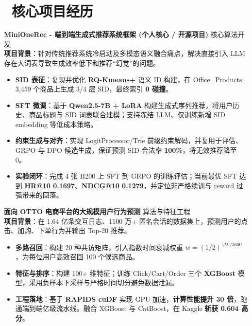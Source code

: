\documentclass[11pt]{article}
\newlength{\interProjectSpacing}
\newcommand{\projectsep}{\vspace{\interProjectSpacing}}
\newlength{\intraProjectTitleSep}
\newcommand{\titlebreak}{\\[\intraProjectTitleSep]}
\newlength{\intraProjectListTopSep}
\begin{document}
\section{\makebox[\widthof{\faUsers}][c]{\color{CVBlue}\faUsers}\ 核心项目经历}

\textbf{MiniOneRec - 端到端生成式推荐系统框架 (个人核心 / 开源项目)} \hfill 核心算法开发 \titlebreak
\textbf{项目背景}：针对传统推荐系统冷启动及多模态语义融合痛点，解决直接引入 LLM 存在大词表导致生成效率低下和推荐“幻觉”的问题。
\begin{itemize}[nosep, topsep=\intraProjectListTopSep]
    \item \textbf{SID 表征}：复现并优化 \textbf{RQ-Kmeans+} 语义 ID 构建，在 Office\_Products 3,459 个商品上生成 3/4 层 SID，最终索引 \textbf{0 碰撞}。
    \item \textbf{SFT 微调}：基于 \textbf{Qwen2.5-7B + LoRA} 构建生成式序列推荐，将用户历史、商品标题与 SID 词表联合建模；支持冻结 LLM、仅训练新增 SID embedding 等低成本策略。
    \item \textbf{约束生成与对齐}：实现 LogitProcessor/Trie 前缀约束解码，并复用于评估、GRPO 与 DPO 候选生成，保证预测 SID 合法率 \textbf{100\%}，将无效推荐降至 0。
    \item \textbf{实验闭环}：完成 4 张 H200 上 SFT 到 GRPO 的训练评估；当前最优 SFT 达到 \textbf{HR@10 0.1697}、\textbf{NDCG@10 0.1279}，并定位非严格续训与 reward 过强带来的回落。
\end{itemize}

\projectsep

\textbf{面向 OTTO 电商平台的大规模用户行为预测} \hfill 算法与特征工程 \titlebreak
\textbf{项目背景}：在 1.64 亿条交互日志、1100 万+ 匿名会话的数据集上，预测用户的点击、加购、下单行为并输出 Top-20 推荐。
\begin{itemize}[nosep, topsep=\intraProjectListTopSep]
    \item \textbf{多路召回}：构建 20 种共访矩阵，引入指数时间衰减权重 $w=(1/2)^{|\Delta t|/3600}$，为每位用户高效召回 100 个候选商品。
    \item \textbf{特征与排序}：构建 100+ 维特征；训练 Click/Cart/Order 三个 \textbf{XGBoost} 模型，采用负样本下采样与严格时间切分避免数据泄漏。
    \item \textbf{工程落地}：基于 \textbf{RAPIDS cuDF} 实现 GPU 加速，\textbf{计算性能提升 30 倍}，跑通端到端亿级流水线。融合 XGBoost 与 CatBoost，在 Kaggle \textbf{斩获 0.604 高分}。
\end{itemize}
\end{document}
